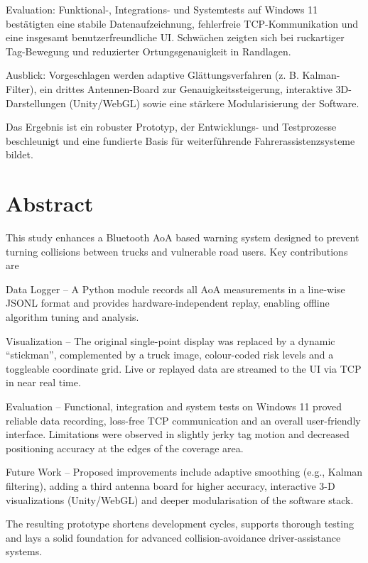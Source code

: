 \documentclass[a4paper, 12pt]{article} %
\begin{document}
Evaluation: Funktional-, Integrations- und Systemtests auf Windows 11 bestätigten eine stabile Datenaufzeichnung, fehlerfreie \ac{TCP}-Kommunikation 
und eine insgesamt benutzer­freundliche \acs{UI}. Schwächen zeigten sich bei ruckartiger Tag-Bewegung und reduzierter Ortungs­genauigkeit in Randlagen.

Ausblick: Vorgeschlagen werden adaptive Glättungs­verfahren (z. B. Kalman-Filter), ein drittes Antennen-Board zur Genauigkeits­steigerung, 
interaktive 3D-Darstellungen (Unity/WebGL) sowie eine stärkere Modularisierung der Software.

Das Ergebnis ist ein robuster Prototyp, der Entwicklungs- und Testprozesse beschleunigt und eine fundierte Basis für weiterführende 
Fahrer­assistenz­systeme bildet.
  
\clearpage
\section*{Abstract}

This study enhances a Bluetooth \acs{AoA} based warning system designed to prevent turning collisions between trucks and vulnerable 
road users.
Key contributions are

Data Logger – A Python module records all \ac{AoA} measurements in a line-wise \ac{JSONL} format and provides hardware-independent replay, enabling offline 
algorithm tuning and analysis.

Visualization – The original single-point display was replaced by a dynamic “stickman”, complemented by a truck image, colour-coded risk levels
 and a toggleable coordinate grid. Live or replayed data are streamed to the \acs{UI} via \acs{TCP} in near real time.

Evaluation – Functional, integration and system tests on Windows 11 proved reliable data recording, loss-free \ac{TCP} communication and an overall 
user-friendly interface. Limitations were observed in slightly jerky tag motion and decreased positioning accuracy at the edges of the coverage area.

Future Work – Proposed improvements include adaptive smoothing (e.g., Kalman filtering), adding a third antenna board for higher accuracy, 
interactive 3-D visualizations (Unity/WebGL) and deeper modularisation of the software stack.

The resulting prototype shortens development cycles, supports thorough testing and lays a solid foundation for advanced collision-avoidance 
driver-assistance systems.
\clearpage
\end{document}
